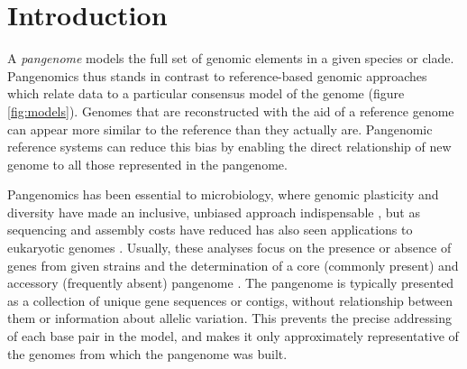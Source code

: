 \section{Introduction}

A \emph{pangenome} models the full set of genomic elements in a given species or clade.
Pangenomics thus stands in contrast to reference-based genomic approaches which relate data to a particular consensus model of the genome (figure \ref{fig:models}).
Genomes that are reconstructed with the aid of a reference genome can appear more similar to the reference than they actually are.
Pangenomic reference systems can reduce this bias by enabling the direct relationship of new genome to all those represented in the pangenome.



Pangenomics has been essential to microbiology, where genomic plasticity and diversity have made an inclusive, unbiased approach indispensable \cite{Vernikos2015}, but as sequencing and assembly costs have reduced has also seen applications to eukaryotic genomes \cite{cao2011whole,gao2019tomato,Ou_2018}.
Usually, these analyses focus on the presence or absence of genes from given strains and the determination of a core (commonly present) and accessory (frequently absent) pangenome \cite{page2015roary}.
The pangenome is typically presented as a collection of unique gene sequences or contigs, without relationship between them or information about allelic variation.
This prevents the precise addressing of each base pair in the model, and makes it only approximately representative of the genomes from which the pangenome was built.


